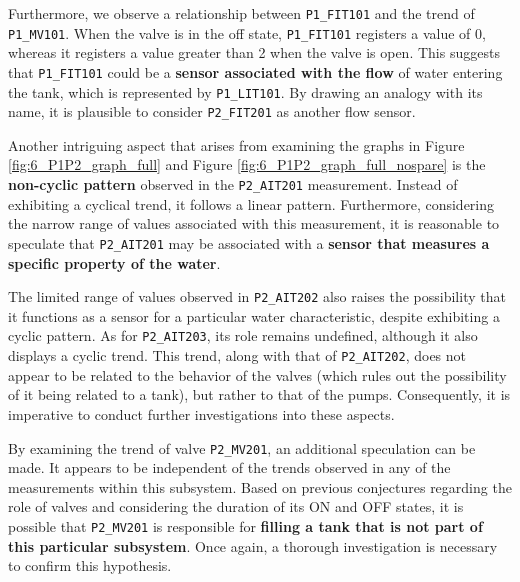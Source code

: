 \bigskip
Furthermore, we observe a relationship between \texttt{P1\_FIT101} and the trend of \texttt{P1\_MV101}. When the valve is in the off state, \texttt{P1\_FIT101} registers a value of 0, whereas it registers a value greater than 2 when the valve is open. This suggests that \texttt{P1\_FIT101} could be a \textbf{sensor associated with the flow} of water entering the tank, which is represented by \texttt{P1\_LIT101}. By drawing an analogy with its name, it is plausible to consider \texttt{P2\_FIT201} as another flow sensor.

\bigskip
Another intriguing aspect that arises from examining the graphs in Figure \ref{fig:6_P1P2_graph_full} and Figure \ref{fig:6_P1P2_graph_full_nospare} is the \textbf{non-cyclic pattern} observed in the \texttt{P2\_AIT201} measurement. Instead of exhibiting a cyclical trend, it follows a linear pattern. Furthermore, considering the narrow range of values associated with this measurement, it is reasonable to speculate that \texttt{P2\_AIT201} may be associated with a \textbf{sensor that measures a specific property of the water}.

The limited range of values observed in \texttt{P2\_AIT202} also raises the possibility that it functions as a sensor for a particular water characteristic, despite exhibiting a cyclic pattern. As for \texttt{P2\_AIT203}, its role remains undefined, although it also displays a cyclic trend. This trend, along with that of \texttt{P2\_AIT202}, does not appear to be related to the behavior of the valves (which rules out the possibility of it being related to a tank), but rather to that of the pumps. Consequently, it is imperative to conduct further investigations into these aspects.

\bigskip
By examining the trend of valve \texttt{P2\_MV201}, an additional speculation can be made. It appears to be independent of the trends observed in any of the measurements within this subsystem. Based on previous conjectures regarding the role of valves and considering the duration of its ON and OFF states, it is possible that \texttt{P2\_MV201} is responsible for \textbf{filling a tank that is not part of this particular subsystem}. Once again, a thorough investigation is necessary to confirm this hypothesis.

